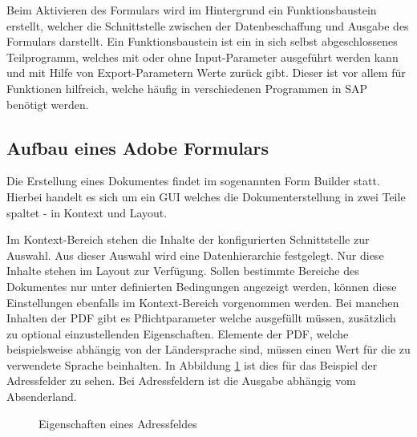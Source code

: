 Beim Aktivieren des Formulars wird im Hintergrund ein Funktionsbaustein erstellt, welcher die Schnittstelle zwischen der Datenbeschaffung und Ausgabe des Formulars darstellt. Ein Funktionsbaustein ist ein in sich selbst abgeschlossenes Teilprogramm, welches mit oder ohne Input-Parameter ausgeführt werden kann und mit Hilfe von Export-Parametern Werte zurück gibt. Dieser ist vor allem für Funktionen hilfreich, welche häufig in verschiedenen Programmen in SAP benötigt werden.

\subsection{Aufbau eines Adobe Formulars}
\label{ch:Aufbau}


Die Erstellung eines Dokumentes findet im sogenannten Form Builder statt. Hierbei handelt es sich um ein \ac{GUI} welches die Dokumenterstellung in zwei Teile spaltet - in Kontext und Layout. 

Im Kontext-Bereich stehen die Inhalte der konfigurierten Schnittstelle zur Auswahl. Aus dieser Auswahl wird eine Datenhierarchie festgelegt. Nur diese Inhalte stehen im  Layout zur Verfügung. Sollen bestimmte Bereiche des Dokumentes nur unter definierten Bedingungen angezeigt werden, können diese Einstellungen ebenfalls im Kontext-Bereich vorgenommen werden. Bei manchen Inhalten der \ac{PDF} gibt es Pflichtparameter welche ausgefüllt müssen, zusätzlich zu optional einzustellenden Eigenschaften.
 Elemente der \ac{PDF}, welche beispielsweise abhängig von der Ländersprache sind, müssen einen Wert für die zu verwendete Sprache beinhalten. In Abbildung \ref{figAD} ist dies für das Beispiel der Adressfelder zu sehen. Bei Adressfeldern ist die Ausgabe abhängig vom Absenderland.
 
 \begin{figure}[ht]
 	\centering
 	
 	\caption{Eigenschaften eines Adressfeldes}
 	\label{figAD}
 	
 \end{figure}

